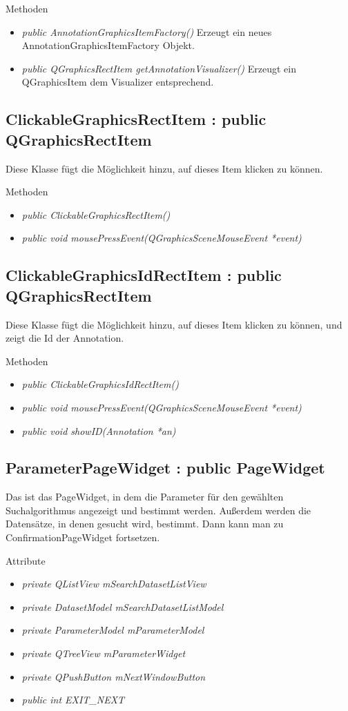 Methoden
\begin{itemize}
	\item\textit{public AnnotationGraphicsItemFactory()} Erzeugt ein neues AnnotationGraphicsItemFactory Objekt.
	\item\textit{public QGraphicsRectItem getAnnotationVisualizer()} Erzeugt ein QGraphicsItem dem Visualizer entsprechend.
\end{itemize}
 
\subsection*{ClickableGraphicsRectItem : public QGraphicsRectItem}
Diese Klasse fügt die Möglichkeit hinzu, auf dieses Item klicken zu können.

Methoden
\begin{itemize}
	\item\textit{public ClickableGraphicsRectItem()}
	\item\textit{public void mousePressEvent(QGraphicsSceneMouseEvent *event)}
\end{itemize}

\subsection*{ClickableGraphicsIdRectItem : public QGraphicsRectItem}
Diese Klasse fügt die Möglichkeit hinzu, auf dieses Item klicken zu können, und zeigt die Id der Annotation.

Methoden
\begin{itemize}
	\item\textit{public ClickableGraphicsIdRectItem()}
	\item\textit{public void mousePressEvent(QGraphicsSceneMouseEvent *event)}
	\item\textit{public void showID(Annotation *an)}
\end{itemize}

\subsection*{ParameterPageWidget : public PageWidget}
Das ist das PageWidget, in dem die Parameter für den gewählten Suchalgorithmus angezeigt und bestimmt werden. Außerdem werden die Datensätze, in denen gesucht wird, bestimmt. Dann kann man zu ConfirmationPageWidget fortsetzen.

Attribute
\begin{itemize}
	\item\textit{private QListView mSearchDatasetListView}
	\item\textit{private DatasetModel mSearchDatasetListModel}
	\item\textit{private ParameterModel mParameterModel}
	\item\textit{private QTreeView mParameterWidget}
	\item\textit{private QPushButton mNextWindowButton}
	\item\textit{public int EXIT\_NEXT}     
\end{itemize}

